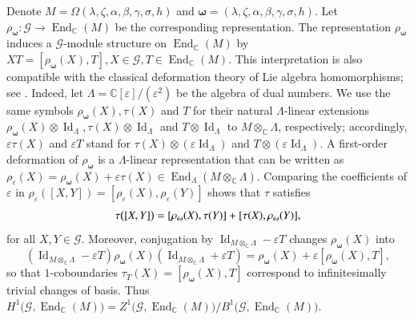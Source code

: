 \documentclass[12pt,reqno]{amsart}
\def\C{\mathbb{C}}
\numberwithin{equation}{section}
\begin{document}
Denote $M=\Omega(\lambda,\zeta,\alpha,\beta,\gamma,\sigma,h)$
and $\boldsymbol{\omega}=(\lambda,\zeta,\alpha,\beta,\gamma,\sigma,h)
.$
Let $\rho_{\boldsymbol{\omega}}: \mathcal G\longrightarrow\operatorname{End}_{\mathbb C}(M)$
be the corresponding representation. 
The representation $\rho_{\boldsymbol{\omega}}$
induces a $\mathcal{G}$-module structure on $\operatorname{End}_{\mathbb C}(M)$ by $XT=[\rho_{\boldsymbol{\omega}}(X),T],
X\in \mathcal{G},T\in\operatorname{End}_{\mathbb C}(M).$
This interpretation is also compatible with the classical deformation
theory of Lie algebra homomorphisms; see
\cite{NijenhuisRichardson}. Indeed, let $\Lambda=\mathbb C[\varepsilon]/(\varepsilon^2)$
be the algebra of dual numbers. We use the same symbols $\rho_{\boldsymbol{\omega}}(X),\tau(X)$ and $T$ for their natural $\Lambda$-linear extensions $\rho_{\boldsymbol{\omega}}(X)\otimes \operatorname{Id}_{\Lambda},\tau(X)\otimes\operatorname{Id}_{\Lambda}$ and $T\otimes\operatorname{Id}_{\Lambda}$ to $M\otimes_{\C}\Lambda$, respectively; accordingly, $\varepsilon\tau(X)$ and $\varepsilon T$ stand for $\tau(X)\otimes(\varepsilon\operatorname{Id}_{\Lambda})$ and $T\otimes(\varepsilon\operatorname{Id}_{\Lambda})$.
A first-order deformation of
$\rho_{\boldsymbol{\omega}}$ is a 
$\Lambda$-linear representation that can be written as $\rho_\varepsilon(X)
=
\rho_{\boldsymbol{\omega}}(X)+\varepsilon\tau(X)\in\operatorname{End}_{\Lambda}(M\otimes_{\C}\Lambda).$
Comparing the coefficients of $\varepsilon$ in $\rho_\varepsilon([X,Y])
=
[\rho_\varepsilon(X),\rho_\varepsilon(Y)]$
shows that $\tau$ satisfies 
\begin{equation}\label{formula 4.1}
\aligned
\tau\big([X,Y]\big)=[\rho_{\boldsymbol{\omega}}(X), \tau(Y)]+[\tau(X),\rho_{\boldsymbol{\omega}}(Y)],
\endaligned
\end{equation}
for all $X,Y\in \mathcal{G}$.  Moreover, conjugation by
$\operatorname{Id}_{M\otimes_{\C}\Lambda}-\varepsilon T$ changes $\rho_{\boldsymbol{\omega}}(X)$ into $$(\operatorname{Id}_{M\otimes_{\C}\Lambda}-\varepsilon T)\rho_{\boldsymbol{\omega}}(X)(\operatorname{Id}_{M\otimes_{\C}\Lambda}+\varepsilon T)
=
\rho_{\boldsymbol{\omega}}(X)
+\varepsilon[\rho_{\boldsymbol{\omega}}(X),T],$$
so that $1$-coboundaries $\tau_T(X)=[\rho_{\boldsymbol{\omega}}(X),T]$ correspond to infinitesimally trivial
changes of basis. Thus $H^1\bigl(\mathcal G,\operatorname{End}_{\mathbb C}(M)\bigr)
=
Z^1\bigl(\mathcal G,\operatorname{End}_{\mathbb C}(M)\bigr)/
B^1\bigl(\mathcal G,\operatorname{End}_{\mathbb C}(M)\bigr).$
\end{document}
